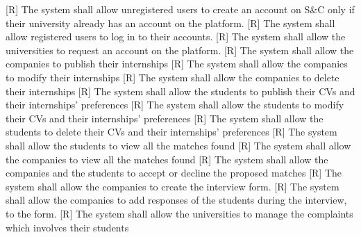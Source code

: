 \documentclass{article}
\begin{document}
\setcounter{requirement}{0}
[R\therequirement] The system shall allow unregistered users to create an account on S\&C only if their university already has an account on the platform.\newline
{}
[R\therequirement] The system shall allow registered users to log in to their accounts.\newline
{}
[R\therequirement] The system shall allow the universities to request an account on the platform.\newline
{}
[R\therequirement] The system shall allow the companies to publish their internships\newline
{}
[R\therequirement] The system shall allow the companies to modify their internships\newline
{}
[R\therequirement] The system shall allow the companies to delete their internships\newline
{}
[R\therequirement] The system shall allow the students to publish their CVs and their internships' preferences\newline
{}
[R\therequirement] The system shall allow the students to modify their CVs and their internships' preferences\newline
{}
[R\therequirement] The system shall allow the students to delete their CVs and their internships' preferences\newline
{}
[R\therequirement] The system shall allow the students to view all the matches found\newline
{}
[R\therequirement] The system shall allow the companies to view all the matches found\newline
{}
[R\therequirement] The system shall allow the companies and the students to accept or decline the proposed matches\newline
{}
[R\therequirement] The system shall allow the companies to create the interview form.\newline
{}
[R\therequirement] The system shall allow the companies to add responses of the students during the interview, to the form.\newline
{}
[R\therequirement] The system shall allow the universities to manage the complaints which involves their students\newline
\end{document}
